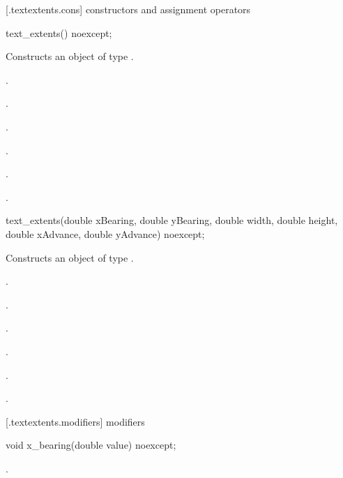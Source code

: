  [\iotwod.textextents.cons] { constructors and assignment operators}

\begin{itemdecl}
    text_extents() noexcept;
\end{itemdecl}
\begin{itemdescr}
	\pnum
	\effects
	Constructs an object of type .
	
	\pnum
	\postconditions
    .
    
    .
    
    .
    
    .
    
    .
    
    .

\end{itemdescr}

\begin{itemdecl}
    text_extents(double xBearing, double yBearing, double width,
      double height, double xAdvance, double yAdvance) noexcept;
\end{itemdecl}
\begin{itemdescr}
	\pnum
	\effects
	Constructs an object of type .
	
	\pnum
	\postconditions
    .
    
    .
    
    .
    
    .
    
    .
    
    .

\end{itemdescr}

 [\iotwod.textextents.modifiers]{ modifiers}

\begin{itemdecl}
    void x_bearing(double value) noexcept;
\end{itemdecl}
\begin{itemdescr}
	\pnum
	\postconditions
	.
\end{itemdescr}


